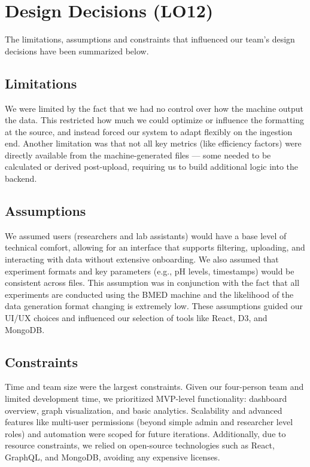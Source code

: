 \documentclass{article}
\begin{document}
\section{Design Decisions (LO12)}

The limitations, assumptions and constraints that influenced our team's design decisions have 
been summarized below.
\subsection{Limitations}
We were limited by the fact that we had no control over how the machine output the data. This 
restricted how much we could optimize or influence the formatting at the source, and instead forced our 
system to adapt flexibly on the ingestion end. Another limitation was that not all key metrics (like 
efficiency factors) were directly available from the machine-generated files — some needed to be calculated 
or derived post-upload, requiring us to build additional logic into the backend.

\subsection{Assumptions}
We assumed users (researchers and lab assistants) would have a base level of technical comfort, allowing 
for an interface that supports filtering, uploading, and interacting with data without extensive onboarding. 
We also assumed that experiment formats and key parameters (e.g., pH levels, timestamps) would be consistent across 
files. This assumption was in conjunction with the fact that all experiments are conducted using the BMED machine 
and the likelihood of the data generation format changing is extremely low. These assumptions guided our UI/UX choices 
and influenced our selection of tools like React, D3, and MongoDB.

\subsection{Constraints}
Time and team size were the largest constraints. Given our four-person team and limited development time, we prioritized 
MVP-level functionality: dashboard overview, graph visualization, and basic analytics. Scalability and advanced features 
like multi-user permissions (beyond simple admin and researcher level roles) and automation were scoped for future iterations. 
Additionally, due to resource constraints, we relied on open-source technologies such as React, GraphQL, and MongoDB, avoiding 
any expensive licenses.
\end{document}

